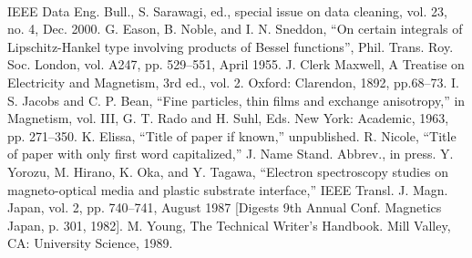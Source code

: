 \documentclass[conference]{IEEEtran}
\begin{document}
\
\begin{thebibliography}{00}
 IEEE Data Eng. Bull., S. Sarawagi, ed., special issue on data
cleaning, vol. 23, no. 4, Dec. 2000.
 G. Eason, B. Noble, and I. N. Sneddon, \enquote{On certain integrals of Lipschitz-Hankel type involving products of Bessel functions}, Phil. Trans. Roy. Soc. London, vol. A247, pp. 529--551, April 1955.
\bibitem{b2} J. Clerk Maxwell, A Treatise on Electricity and Magnetism, 3rd ed., vol. 2. Oxford: Clarendon, 1892, pp.68--73.
\bibitem{b3} I. S. Jacobs and C. P. Bean, ``Fine particles, thin films and exchange anisotropy,'' in Magnetism, vol. III, G. T. Rado and H. Suhl, Eds. New York: Academic, 1963, pp. 271--350.
\bibitem{b4} K. Elissa, ``Title of paper if known,'' unpublished.
\bibitem{b5} R. Nicole, ``Title of paper with only first word capitalized,'' J. Name Stand. Abbrev., in press.
\bibitem{b6} Y. Yorozu, M. Hirano, K. Oka, and Y. Tagawa, ``Electron spectroscopy studies on magneto-optical media and plastic substrate interface,'' IEEE Transl. J. Magn. Japan, vol. 2, pp. 740--741, August 1987 [Digests 9th Annual Conf. Magnetics Japan, p. 301, 1982].
\bibitem{b7} M. Young, The Technical Writer's Handbook. Mill Valley, CA: University Science, 1989.
\end{thebibliography}
\end{document}

